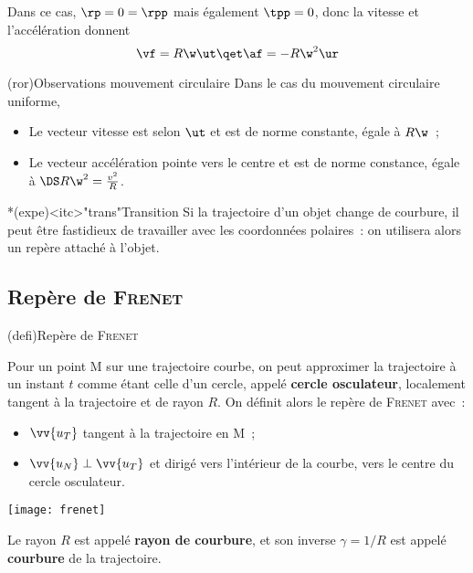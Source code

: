 \documentclass[../../main/main.tex]{subfiles}
\begin{document}
Dans ce cas, $\rp = 0 = \rpp$ mais également $\tpp = 0$, donc la vitesse et
l'accélération donnent
\[
	\vf = R\w\ut
	\qet
	\af = -R\w^2\ur
\]

\begin{tcb*}(ror){Observations mouvement circulaire}
	Dans le cas du mouvement circulaire uniforme,
	\begin{itemize}
		\item Le vecteur vitesse est selon $\ut$ et est de norme constante,
		      égale à $R\w$~;
		\item Le vecteur accélération pointe vers le centre et est de norme
		      constance, égale à $\DS R\w^2 = \frac{v^2}{R}$.
	\end{itemize}
\end{tcb*}

\begin{tcb}*(expe)<itc>"trans"{Transition}
	Si la trajectoire d'un objet change de courbure, il peut être fastidieux de
	travailler avec les coordonnées polaires~: on utilisera alors un repère
	attaché à l'objet.
\end{tcb}

\subsection{Repère de \textsc{Frenet}}

\begin{tcb*}(defi){Repère de \textsc{Frenet}}
	\begin{minipage}{0.70\linewidth}
		Pour un point M sur une trajectoire courbe, on peut approximer la
		trajectoire à un instant $t$ comme étant celle d'un cercle, appelé
		\textbf{cercle osculateur}, localement tangent à la trajectoire et de rayon
		$R$. On définit alors le repère de \textsc{Frenet} avec~: \bigbreak
		\begin{itemize}
			\item $\vv{u_T}$ tangent à la trajectoire en M~;
			\item $\vv{u_N} \perp \vv{u_T}$ et dirigé vers l'intérieur de la
			      courbe, vers le centre du cercle osculateur.
		\end{itemize}
	\end{minipage}
	\hfill
	\begin{minipage}{0.25\linewidth}
		\begin{center}
			\texttt{[image: frenet]}
		\end{center}
	\end{minipage} \bigbreak
	Le rayon $R$ est appelé \textbf{rayon de courbure}, et son inverse $\gamma =
		1/R$ est appelé \textbf{courbure} de la trajectoire.
\end{tcb*}
\end{document}
